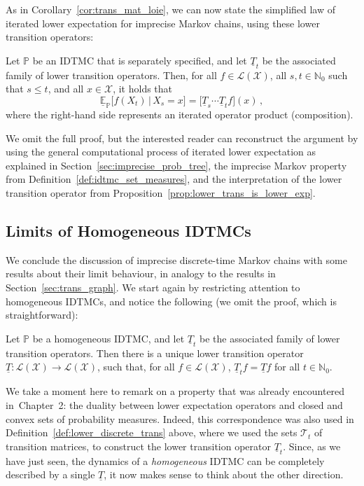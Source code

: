 \documentclass[graybox]{svmult}
\newcommand{\nats}{\mathbb{N}}
\newcommand{\natswith}{\nats_{0}}
\newcommand{\states}{\mathcal{X}}
\newcommand{\gambles}{\mathcal{L}}
\newcommand{\gamblesX}{\gambles(\states)}
\def\refIPChapter{Chapter~2}
\begin{document}
As in Corollary~\ref{cor:trans_mat_loie}, we can now state the simplified law of iterated lower expectation for imprecise Markov chains, using these lower transition operators:
\begin{theorem}\label{thm:loile_dt}
Let $\mathbb{P}$ be an IDTMC that is separately specified, and let $\underline{T}_t$ be the associated family of lower transition operators. Then, for all $f\in\gamblesX$, all $s,t\in\natswith$ such that $s\leq t$, and all $x\in\states$, it holds that
\begin{equation*}
\underline{\mathbb{E}}_\mathbb{P}\bigl[f(X_t)\,\big\vert\,X_s=x\bigr] = \bigl[\underline{T}_s\cdots \underline{T}_tf\bigr](x)\,,
\end{equation*}
where the right-hand side represents an iterated operator product (composition). 
\end{theorem}
We omit the full proof, but the interested reader can reconstruct the argument by using the general computational process of iterated lower expectation as explained in Section~\ref{sec:imprecise_prob_tree}, the imprecise Markov property from Definition~\ref{def:idtmc_set_measures}, and the interpretation of the lower transition operator from Proposition~\ref{prop:lower_trans_is_lower_exp}.

\subsection{Limits of Homogeneous IDTMCs}

We conclude the discussion of imprecise discrete-time Markov chains with some results about their limit behaviour, in analogy to the results in Section~\ref{sec:trans_graph}. We start again by restricting attention to homogeneous IDTMCs, and notice the following (we omit the proof, which is straightforward):
\begin{proposition}
Let $\mathbb{P}$ be a homogeneous IDTMC, and let $\underline{T}_t$ be the associated family of lower transition operators. Then there is a unique lower transition operator $\underline{T}:\gamblesX\to\gamblesX$, such that, for all $f\in\gamblesX$, $\underline{T}_tf=\underline{T}f$ for all $t\in\natswith$.
\end{proposition}

We take a moment here to remark on a property that was already encountered in~\refIPChapter: the duality between lower expectation operators and closed and convex sets of probability measures. Indeed, this correspondence was also used in Definition~\ref{def:lower_discrete_trans} above, where we used the sets $\mathcal{T}_t$ of transition matrices, to construct the lower transition operator $\underline{T}_t$. Since, as we have just seen, the dynamics of a \emph{homogeneous} IDTMC can be completely described by a single $\underline{T}$, it now makes sense to think about the other direction. 
\end{document}
